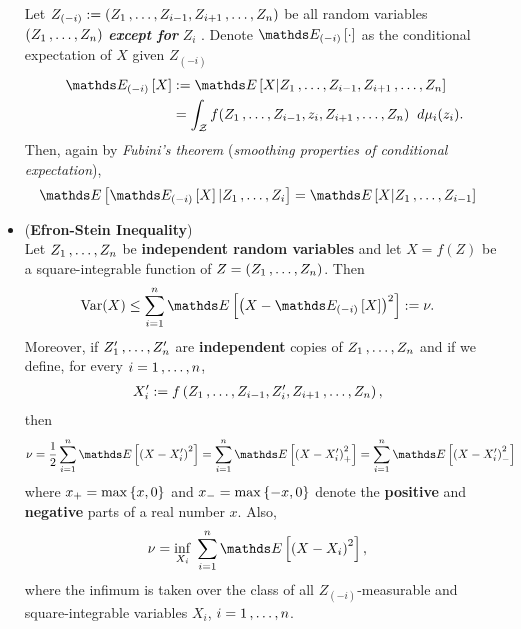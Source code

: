 \documentclass[11pt]{article}
\begin{document}
\begin{itemize}
\begin{remark}
Let $Z_{(-i)} := (Z_1 \,{,}\ldots{,}\, Z_{i-1}, Z_{i+1} \,{,}\ldots{,}\, Z_n)$ be all random variables $(Z_1 \,{,}\ldots{,}\, Z_n)$ \emph{\textbf{except for}} $Z_i$ . Denote $\E{(-i)}{\cdot}$ as the conditional expectation of $X$ given $Z_{(-i)}$
\begin{align*}
 \E{(-i)}{X} &:= \E{}{X | Z_1 \xdotx{,} Z_{i-1}, Z_{i+1} \xdotx{,} Z_n} \\
 &= \int_{\cZ} f(Z_1 \xdotx{,} Z_{i-1}, z_{i}, Z_{i+1} \xdotx{,} Z_n) \;\;d\mu_{i}(z_{i}).
\end{align*} Then, again by \emph{Fubini's theorem} (\emph{smoothing properties of conditional expectation}),
\begin{align}
\E{}{ \E{(-i)}{X} | Z_1 \xdotx{,} Z_i} &= \E{}{X | Z_1 \xdotx{,} Z_{i-1}} \label{eqn: martingale_smoothing_expectation}
\end{align} 
\end{remark}

\item \begin{proposition}(\textbf{Efron-Stein Inequality}) \citep{boucheron2013concentration} \\
Let $Z_1 \,{,}\ldots{,}\, Z_n$ be \textbf{independent random variables} and let $X = f(Z)$ be a square-integrable function of $Z = (Z_1 \,{,}\ldots{,}\, Z_n)$. Then
\begin{align}
\text{Var}(X) &\le  \sum_{i=1}^{n}\E{}{\paren{X - \E{(-i)}{X}}^2} := \nu.  \label{ineqn: efron_stein_inequality}
\end{align}
Moreover, if $Z_1' \,{,}\ldots{,}\, Z_n'$ are \textbf{independent} copies of $Z_1 \,{,}\ldots{,}\, Z_n$ and if we define, for every $i = 1 \,{,}\ldots{,}\, n$,
\begin{align*}
X_i' &:= f\left(Z_1 \,{,}\ldots{,}\, Z_{i-1}, Z_{i}' ,Z_{i+1} \,{,}\ldots{,}\, Z_n\right),
\end{align*}
then
\begin{align*}
\nu &= \frac{1}{2}\sum_{i=1}^{n}\E{}{\paren{X -  X_i'}^2} = \sum_{i=1}^{n}\E{}{\paren{X -  X_i'}_{+}^2} = \sum_{i=1}^{n}\E{}{\paren{X -  X_i'}_{-}^2}
\end{align*}
where $x_{+} = \max\left\{x, 0\right\}$ and $x_{-} = \max\left\{-x, 0\right\}$ denote the \textbf{positive} and \textbf{negative} parts of a real number $x$. Also,
\begin{align*}
\nu &= \inf_{X_i}\;\sum_{i=1}^{n}\E{}{\paren{X -  X_i}^2},
\end{align*}
where the infimum is taken over the class of all $Z_{(-i)}$-measurable and square-integrable variables $X_i$, $i = 1 \,{,}\ldots{,}\, n$.
\end{proposition}



\end{itemize}
\end{document}
